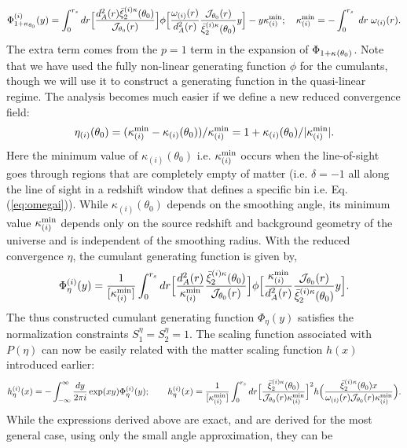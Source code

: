\documentclass[usenatbib]{mn2e}
\def\n{\noindent}
\def\be{\begin{equation}}
\def\ee{\end{equation}}
\def\be{\begin{equation}}
\def\ee{\end{equation}}
\def\exnew{{\cal J}_{\theta_0}(r)}
\def\avi{\bar\xi_2^{(i)\kappa}(\theta_0)}
\def\kminnew{{\kappa^{\rm min}_{(i)}}}
\begin{document}
\begin{equation}
\Phi^{(i)}_{1+\kappa_{\theta_0}}(y) =  \int_0^{r_s} dr
\Big[ { d_A^2(r) \avi \over  \exnew} \Big
] \phi \Big [{\omega_{(i)} (r) \over d_A^2 (r)} {\exnew \over \avi}y \Big ] -y \kappa_{(i)}^{\rm min}; \quad
\kappa^{\rm min}_{(i)} = - \int_0^{r_s}\; dr\;\omega_{(i)}(r) .
\end{equation}
%
The extra term comes from the $p=1$ term in the expansion 
of $\Phi_{1+\kappa_{\rm  }(\theta_0)}$.
Note that we have used the fully non-linear generating function $\phi$
for the cumulants, though we will use it to construct a generating 
function in the quasi-linear regime. The analysis becomes much easier if we define a new reduced convergence 
field:
\be
\eta_{(i)}({\theta_0}) = {{( \kappa^{\rm min}_{(i)}-\kappa_{(i)}({\theta_0})}) /
\kappa^{\rm min}_{(i)}} = 1 + {\kappa_{(i)}({\theta_0})/ |\kappa^{\rm min}_{(i)}| }.
\ee
Here the minimum value of $\kappa_{(i)}(\theta_0)$ i.e. $\kappa^{\rm min}_{(i)}$ occurs
when the line-of-sight goes through regions that are completely empty of
matter (i.e. $\delta = -1$ all along the line of sight in a redshift window that defines a specific bin i.e. Eq.(\ref{eq:omegai})).
While $\kappa_{(i)}({\theta_0})$ depends on the smoothing
angle, its minimum value $\kappa^{\rm min}_{(i)}$
depends only on the source redshift and background geometry of the
universe and is independent of the smoothing radius. With the reduced
convergence $\eta$, the cumulant generating function is given by,
%
\begin{equation}
\Phi^{(i)}_{\eta} (y) = { 1 \over [\kminnew]} \int_0^{r_s} dr
\Big [{ d_A^2(r) \over \kminnew}{ \avi \over \exnew }\Big ] \phi \Big [
{\kminnew \over d_A^2(r)} {\exnew \over \avi}y \Big ].
\end{equation}
%
The thus constructed cumulant generating function  
 $\Phi_{\eta}(y)$ satisfies the normalization constraints $S^{\eta}_1 = S^{\eta}_2 = 1$.
The scaling function associated with $P(\eta)$ can now be 
 easily related with the matter scaling function $h(x)$ 
introduced earlier:
%
\begin{equation}
h^{(i)}_{\eta} (x) = - \int_{-\infty}^{\infty} { dy \over 2 \pi i} \exp (x
y) \Phi^{(i)}_{\eta} (y); \quad\quad
h_{\eta}^{(i)} (x) = { 1 \over [\kminnew]}
\int_0^{r_s}  dr 
\Big [ {\avi \over  \exnew
\kminnew } \Big ]^2 
   h \Big ({\avi x \over \omega_{(i)}(r) 
\exnew \kminnew } \Big ).  
\end{equation}
%
\n
While the expressions derived above are exact, and are derived for the most
general case, using only the small angle approximation, they can be
\end{document}

